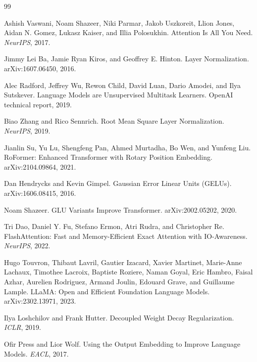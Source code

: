 \documentclass[11pt,a4paper]{article}
\theoremstyle{definition}
\theoremstyle{plain}
\begin{document}
\begin{thebibliography}{99}

Ashish Vaswani, Noam Shazeer, Niki Parmar, Jakob Uszkoreit, Llion Jones, Aidan N. Gomez, Lukasz Kaiser, and Illia Polosukhin.
\newblock Attention Is All You Need.
\newblock \emph{NeurIPS}, 2017.

Jimmy Lei Ba, Jamie Ryan Kiros, and Geoffrey E. Hinton.
\newblock Layer Normalization.
\newblock arXiv:1607.06450, 2016.

Alec Radford, Jeffrey Wu, Rewon Child, David Luan, Dario Amodei, and Ilya Sutskever.
\newblock Language Models are Unsupervised Multitask Learners.
\newblock OpenAI technical report, 2019.

Biao Zhang and Rico Sennrich.
\newblock Root Mean Square Layer Normalization.
\newblock \emph{NeurIPS}, 2019.

Jianlin Su, Yu Lu, Shengfeng Pan, Ahmed Murtadha, Bo Wen, and Yunfeng Liu.
\newblock RoFormer: Enhanced Transformer with Rotary Position Embedding.
\newblock arXiv:2104.09864, 2021.

Dan Hendrycks and Kevin Gimpel.
\newblock Gaussian Error Linear Units (GELUs).
\newblock arXiv:1606.08415, 2016.

Noam Shazeer.
\newblock GLU Variants Improve Transformer.
\newblock arXiv:2002.05202, 2020.

Tri Dao, Daniel Y. Fu, Stefano Ermon, Atri Rudra, and Christopher Re.
\newblock FlashAttention: Fast and Memory-Efficient Exact Attention with IO-Awareness.
\newblock \emph{NeurIPS}, 2022.

Hugo Touvron, Thibaut Lavril, Gautier Izacard, Xavier Martinet, Marie-Anne Lachaux, Timothee Lacroix, Baptiste Roziere, Naman Goyal, Eric Hambro, Faisal Azhar, Aurelien Rodriguez, Armand Joulin, Edouard Grave, and Guillaume Lample.
\newblock LLaMA: Open and Efficient Foundation Language Models.
\newblock arXiv:2302.13971, 2023.

Ilya Loshchilov and Frank Hutter.
\newblock Decoupled Weight Decay Regularization.
\newblock \emph{ICLR}, 2019.

Ofir Press and Lior Wolf.
\newblock Using the Output Embedding to Improve Language Models.
\newblock \emph{EACL}, 2017.


\end{thebibliography}
\end{document}
